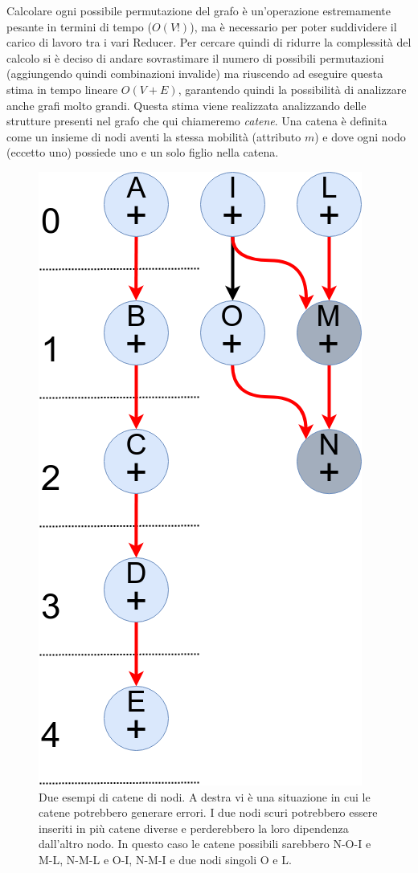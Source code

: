 \documentclass[]{IEEEtran}
\begin{document}
Calcolare ogni possibile permutazione del grafo è un'operazione estremamente pesante in termini di tempo ($O(V!)$), ma è necessario per poter suddividere il carico di lavoro tra i vari Reducer. Per cercare quindi di ridurre la complessità del calcolo si è  deciso di andare sovrastimare il numero di possibili permutazioni (aggiungendo quindi combinazioni invalide) ma riuscendo ad eseguire questa stima in tempo lineare $O(V+E)$, garantendo quindi la possibilità di analizzare anche grafi molto grandi. Questa stima viene realizzata analizzando delle strutture presenti nel grafo che qui chiameremo \emph{catene}. Una catena è definita come un insieme di nodi aventi la stessa mobilità (attributo $m$) e dove ogni nodo (eccetto uno) possiede uno e un solo figlio nella catena.

\begin{figure}[htp]
	\centering
	\includegraphics[height=0.25\textheight]{images/chains.png}
	\caption{Due esempi di catene di nodi. A destra vi è una situazione in cui le catene potrebbero generare errori. I due nodi scuri potrebbero essere inseriti in più catene diverse e perderebbero la loro dipendenza dall'altro nodo. In questo caso le catene possibili sarebbero N-O-I e M-L, N-M-L e O-I, N-M-I e due nodi singoli O e L. }
\end{figure}
\end{document}
